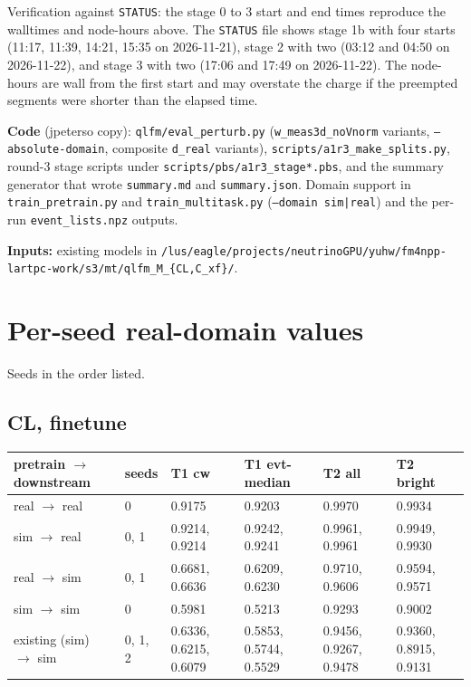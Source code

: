 \documentclass[10pt,a4paper]{article}
\begin{document}
Verification against \texttt{STATUS}: the stage 0 to 3 start and end times reproduce the walltimes and node-hours above. The \texttt{STATUS} file shows stage 1b with four starts (11:17, 11:39, 14:21, 15:35 on 2026-11-21), stage 2 with two (03:12 and 04:50 on 2026-11-22), and stage 3 with two (17:06 and 17:49 on 2026-11-22). The node-hours are wall from the first start and may overstate the charge if the preempted segments were shorter than the elapsed time.

\textbf{Code} (jpeterso copy): \texttt{qlfm/\allowbreak{}eval\_\allowbreak{}perturb.py} (\texttt{w\_\allowbreak{}meas3d\_\allowbreak{}noVnorm} variants, \texttt{--absolute-domain}, composite \texttt{d\_\allowbreak{}real} variants), \texttt{scripts/\allowbreak{}a1r3\_\allowbreak{}make\_\allowbreak{}splits.py}, round-3 stage scripts under \texttt{scripts/\allowbreak{}pbs/\allowbreak{}a1r3\_\allowbreak{}stage*.pbs}, and the summary generator that wrote \texttt{summary.md} and \texttt{summary.json}. Domain support in \texttt{train\_\allowbreak{}pretrain.py} and \texttt{train\_\allowbreak{}multitask.py} (\texttt{--domain sim|real}) and the per-run \texttt{event\_\allowbreak{}lists.npz} outputs.

\textbf{Inputs:} existing models in \texttt{/\allowbreak{}lus/\allowbreak{}eagle/\allowbreak{}projects/\allowbreak{}neutrinoGPU/\allowbreak{}yuhw/\allowbreak{}fm4npp-lartpc-work/\allowbreak{}s3/\allowbreak{}mt/\allowbreak{}qlfm\_\allowbreak{}M\_\allowbreak{}\{CL,C\_\allowbreak{}xf\}/\allowbreak{}}.

\appendix
\section{Per-seed real-domain values}
Seeds in the order listed.

\subsection{CL, finetune}
\begin{center}\footnotesize
\setlength{\tabcolsep}{3pt}\renewcommand{\arraystretch}{1.15}
\begin{tabularx}{\linewidth}{LLLLLL}
\toprule
\textbf{pretrain $\rightarrow$ downstream} & \textbf{seeds} & \textbf{T1 cw} & \textbf{T1 evt-median} & \textbf{T2 all} & \textbf{T2 bright} \\
\midrule
real $\rightarrow$ real & 0 & 0.9175 & 0.9203 & 0.9970 & 0.9934 \\
sim $\rightarrow$ real & 0, 1 & 0.9214, 0.9214 & 0.9242, 0.9241 & 0.9961, 0.9961 & 0.9949, 0.9930 \\
real $\rightarrow$ sim & 0, 1 & 0.6681, 0.6636 & 0.6209, 0.6230 & 0.9710, 0.9606 & 0.9594, 0.9571 \\
sim $\rightarrow$ sim & 0 & 0.5981 & 0.5213 & 0.9293 & 0.9002 \\
existing (sim) $\rightarrow$ sim & 0, 1, 2 & 0.6336, 0.6215, 0.6079 & 0.5853, 0.5744, 0.5529 & 0.9456, 0.9267, 0.9478 & 0.9360, 0.8915, 0.9131 \\
\bottomrule
\end{tabularx}
\end{center}
\end{document}
